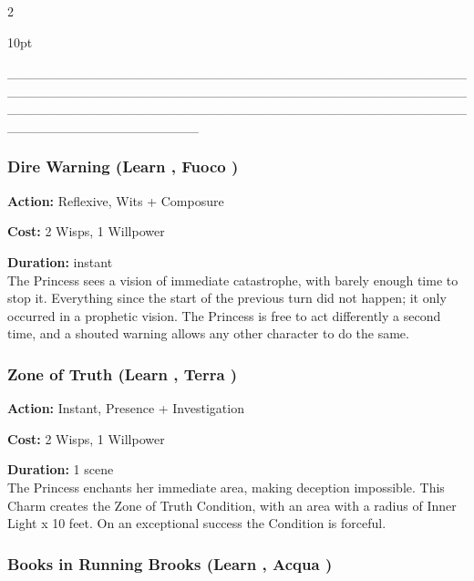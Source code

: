 \begin{multicols}{2}
\begin{myindentpar}{10pt}
	\end{myindentpar}



____________________________________________________________________________________________________________________________________________________________________




\subsubsection*{Dire Warning (Learn \textbullet\textbullet\textbullet\textbullet, Fuoco \textbullet\textbullet\textbullet)}

\noindent \textbf{Action:} Reflexive, Wits + Composure

\noindent \textbf{Cost:} 2 Wisps, 1 Willpower

\noindent \textbf{Duration:} instant \\

\noindent The Princess sees a vision of immediate catastrophe, with barely enough time to stop it. Everything since the start of the previous turn did not happen; it only occurred in a prophetic vision. The Princess is free to act differently a second time, and a shouted warning allows any other character to do the same.

\subsubsection*{Zone of Truth (Learn \textbullet\textbullet\textbullet\textbullet, Terra \textbullet\textbullet\textbullet)}

\noindent \textbf{Action:} Instant, Presence + Investigation

\noindent \textbf{Cost:} 2 Wisps, 1 Willpower

\noindent \textbf{Duration:} 1 scene \\

\noindent The Princess enchants her immediate area, making deception impossible. This Charm creates the Zone of Truth Condition, with an area with a radius of Inner Light x 10 feet. On an exceptional success the Condition is forceful. 

\subsubsection*{Books in Running Brooks (Learn \textbullet\textbullet\textbullet\textbullet\textbullet, Acqua \textbullet\textbullet\textbullet\textbullet)}


\end{multicols}
